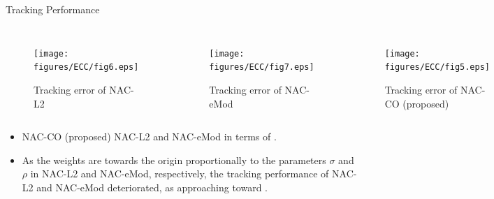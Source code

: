 \documentclass[8pt, aspectratio=169]{beamer}
\newcommand{\ctxt}[2]{\color{#1}{#2}\color{black}}
\begin{document}
\begin{frame}{\insertsubsectionhead}{Tracking Performance}

  \begin{columns}
    

      \begin{figure}      
        \texttt{[image: figures/ECC/fig6.eps]}
        \caption{Tracking error of NAC-L2}
      \end{figure}
      

      \begin{figure}
        \texttt{[image: figures/ECC/fig7.eps]}
        \caption{Tracking error of NAC-eMod}
      \end{figure}


      \begin{figure}
        \texttt{[image: figures/ECC/fig5.eps]}
        \caption{Tracking error of NAC-CO (proposed)}
      \end{figure}

  \end{columns}

  \begin{itemize}
    \item NAC-CO (proposed) \ctxt{airforceblue}{outperformed } NAC-L2 and NAC-eMod in terms of \ctxt{awesome}{tracking performance}.
    \item As the weights are \ctxt{awesome}{biased }towards the origin proportionally to the parameters $\sigma$ and $\rho$ in NAC-L2 and NAC-eMod, respectively, the tracking performance of NAC-L2 and NAC-eMod deteriorated, as approaching toward \ctxt{airforceblue}{suboptimal points}.
  \end{itemize}

\end{frame}

\end{document}
